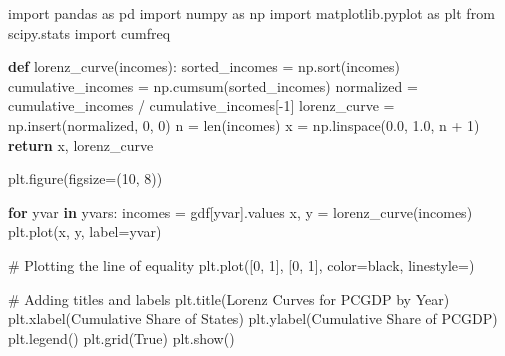 \documentclass[
  a4paper, 
  twoside,
  final
]{article}
\newenvironment{Shaded}{\begin{snugshade}}{\end{snugshade}}
\newcommand{\BuiltInTok}[1]{\textcolor[rgb]{0.00,0.23,0.31}{#1}}
\newcommand{\CommentTok}[1]{\textcolor[rgb]{0.37,0.37,0.37}{#1}}
\newcommand{\ControlFlowTok}[1]{\textcolor[rgb]{0.00,0.23,0.31}{\textbf{#1}}}
\newcommand{\DecValTok}[1]{\textcolor[rgb]{0.68,0.00,0.00}{#1}}
\newcommand{\FloatTok}[1]{\textcolor[rgb]{0.68,0.00,0.00}{#1}}
\newcommand{\ImportTok}[1]{\textcolor[rgb]{0.00,0.46,0.62}{#1}}
\newcommand{\KeywordTok}[1]{\textcolor[rgb]{0.00,0.23,0.31}{\textbf{#1}}}
\newcommand{\NormalTok}[1]{\textcolor[rgb]{0.00,0.23,0.31}{#1}}
\newcommand{\OperatorTok}[1]{\textcolor[rgb]{0.37,0.37,0.37}{#1}}
\newcommand{\StringTok}[1]{\textcolor[rgb]{0.13,0.47,0.30}{#1}}
\newcommand{\VariableTok}[1]{\textcolor[rgb]{0.07,0.07,0.07}{#1}}
\begin{document}
\begin{Shaded}
\begin{Highlighting}[]
\ImportTok{import}\NormalTok{ pandas }\ImportTok{as}\NormalTok{ pd}
\ImportTok{import}\NormalTok{ numpy }\ImportTok{as}\NormalTok{ np}
\ImportTok{import}\NormalTok{ matplotlib.pyplot }\ImportTok{as}\NormalTok{ plt}
\ImportTok{from}\NormalTok{ scipy.stats }\ImportTok{import}\NormalTok{ cumfreq}

\KeywordTok{def}\NormalTok{ lorenz\_curve(incomes):}
\NormalTok{    sorted\_incomes }\OperatorTok{=}\NormalTok{ np.sort(incomes)}
\NormalTok{    cumulative\_incomes }\OperatorTok{=}\NormalTok{ np.cumsum(sorted\_incomes)}
\NormalTok{    normalized }\OperatorTok{=}\NormalTok{ cumulative\_incomes }\OperatorTok{/}\NormalTok{ cumulative\_incomes[}\OperatorTok{{-}}\DecValTok{1}\NormalTok{]}
\NormalTok{    lorenz\_curve }\OperatorTok{=}\NormalTok{ np.insert(normalized, }\DecValTok{0}\NormalTok{, }\DecValTok{0}\NormalTok{)}
\NormalTok{    n }\OperatorTok{=} \BuiltInTok{len}\NormalTok{(incomes)}
\NormalTok{    x }\OperatorTok{=}\NormalTok{ np.linspace(}\FloatTok{0.0}\NormalTok{, }\FloatTok{1.0}\NormalTok{, n }\OperatorTok{+} \DecValTok{1}\NormalTok{)}
    \ControlFlowTok{return}\NormalTok{ x, lorenz\_curve}


\NormalTok{plt.figure(figsize}\OperatorTok{=}\NormalTok{(}\DecValTok{10}\NormalTok{, }\DecValTok{8}\NormalTok{))}

\ControlFlowTok{for}\NormalTok{ yvar }\KeywordTok{in}\NormalTok{ yvars:}
\NormalTok{    incomes }\OperatorTok{=}\NormalTok{ gdf[yvar].values}
\NormalTok{    x, y }\OperatorTok{=}\NormalTok{ lorenz\_curve(incomes)}
\NormalTok{    plt.plot(x, y, label}\OperatorTok{=}\NormalTok{yvar)}

\CommentTok{\# Plotting the line of equality}
\NormalTok{plt.plot([}\DecValTok{0}\NormalTok{, }\DecValTok{1}\NormalTok{], [}\DecValTok{0}\NormalTok{, }\DecValTok{1}\NormalTok{], color}\OperatorTok{=}\StringTok{\textquotesingle{}black\textquotesingle{}}\NormalTok{, linestyle}\OperatorTok{=}\StringTok{\textquotesingle{}{-}{-}\textquotesingle{}}\NormalTok{)}

\CommentTok{\# Adding titles and labels}
\NormalTok{plt.title(}\StringTok{\textquotesingle{}Lorenz Curves for PCGDP by Year\textquotesingle{}}\NormalTok{)}
\NormalTok{plt.xlabel(}\StringTok{\textquotesingle{}Cumulative Share of States\textquotesingle{}}\NormalTok{)}
\NormalTok{plt.ylabel(}\StringTok{\textquotesingle{}Cumulative Share of PCGDP\textquotesingle{}}\NormalTok{)}
\NormalTok{plt.legend()}
\NormalTok{plt.grid(}\VariableTok{True}\NormalTok{)}
\NormalTok{plt.show()}
\end{Highlighting}
\end{Shaded}
\end{document}
